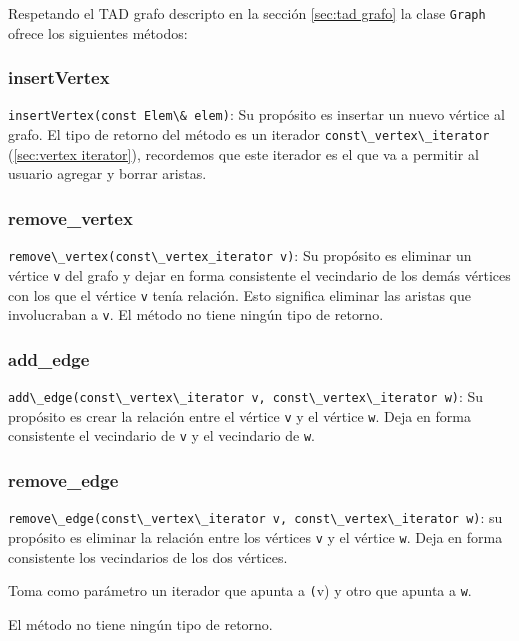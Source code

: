 \documentclass[a4paper,12pt]{article}
\makeatletter
\newcommand{\Code}[1]{\lstinline[basicstyle={\tt}]@#1@}
\makeatother
\begin{document}
Respetando el TAD grafo descripto en la sección \ref{sec:tad grafo} la clase \Code{Graph} ofrece los siguientes métodos:
\subsubsection{insertVertex}
\label{sec:insertVertex}
\Code{insertVertex(const Elem\& elem)}: Su propósito es insertar un nuevo vértice al grafo.
El tipo de retorno del método es un iterador \Code{const\_vertex\_iterator} (\ref{sec:vertex iterator}), recordemos que este iterador es el que va a permitir al usuario agregar y borrar aristas.


\subsubsection{remove\_vertex}
\label{sec:remove-vertex}

\Code{remove\_vertex(const\_vertex_iterator v)}: Su propósito es eliminar un vértice \Code{v} del grafo y dejar en forma consistente el vecindario de los demás vértices con los que el vértice \Code{v} tenía relación. Esto significa eliminar las aristas que involucraban a \Code{v}.
El método no tiene ningún tipo de retorno.



\subsubsection{add\_edge}
\label{sec:add-edge}
\Code{add\_edge(const\_vertex\_iterator v, const\_vertex\_iterator w)}: Su propósito es crear la relación entre el vértice \Code{v} y el vértice \Code{w}. Deja en forma consistente el vecindario de \Code{v} y el vecindario de \Code{w}.

\subsubsection{remove\_edge}
\label{sec:remove-edge}
\Code{remove\_edge(const\_vertex\_iterator v, const\_vertex\_iterator w)}: su propósito es eliminar la relación entre los vértices \Code{v} y el vértice \Code{w}. Deja en forma consistente los vecindarios de los dos vértices.

Toma como parámetro un iterador que apunta a \Code(v) y otro que apunta a \Code{w}.

El método no tiene ningún tipo de retorno.
\end{document}
